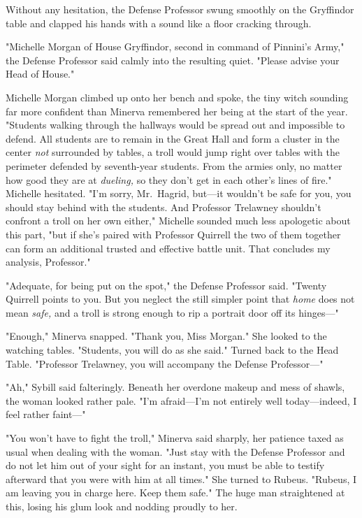 Without any hesitation, the Defense Professor swung smoothly on the Gryffindor
table and clapped his hands with a sound like a floor cracking through.

"Michelle Morgan of House Gryffindor, second in command of Pinnini's Army," the
Defense Professor said calmly into the resulting quiet. "Please advise your
Head of House."

Michelle Morgan climbed up onto her bench and spoke, the tiny witch sounding
far more confident than Minerva remembered her being at the start of the year.
"Students walking through the hallways would be spread out and impossible to
defend. All students are to remain in the Great Hall and form a cluster in the
center{\el} \emph{not} surrounded by tables, a troll would jump right over
tables{\el} with the perimeter defended by seventh-year students. From the
armies only, no matter how good they are at \emph{dueling,} so they don't get
in each other's lines of fire." Michelle hesitated. "I'm sorry, Mr.~Hagrid,
but---it wouldn't be safe for you, you should stay behind with the students.
And Professor Trelawney shouldn't confront a troll on her own either," Michelle
sounded much less apologetic about this part, "but if she's paired with
Professor Quirrell the two of them together can form an additional trusted and
effective battle unit. That concludes my analysis, Professor."

"Adequate, for being put on the spot," the Defense Professor said. "Twenty
Quirrell points to you. But you neglect the still simpler point that
\emph{home} does not mean \emph{safe,} and a troll is strong enough to rip a
portrait door off its hinges\mbox{---}"

"Enough," Minerva snapped. "Thank you, Miss Morgan." She looked to the watching
tables. "Students, you will do as she said." Turned back to the Head Table.
"Professor Trelawney, you will accompany the Defense Professor\mbox{---}"

"Ah," Sybill said falteringly. Beneath her overdone makeup and mess of shawls,
the woman looked rather pale. "I'm afraid---I'm not entirely well
today---indeed, I feel rather faint\mbox{---}"

"You won't have to fight the troll," Minerva said sharply, her patience taxed
as usual when dealing with the woman. "Just stay with the Defense Professor and
do not let him out of your sight for an instant, you must be able to testify
afterward that you were with him at all times." She turned to Rubeus.
"Rubeus, I am leaving you in charge here. Keep them safe." The huge man
straightened at this, losing his glum look and nodding proudly to her.

